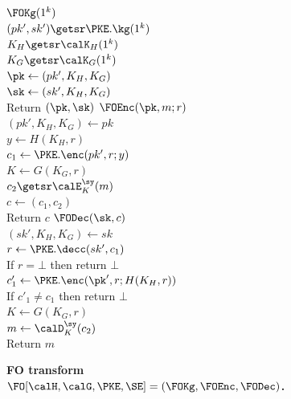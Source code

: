 \begin{figure}
    {\underline{$\FOKg(1^k)$}\\
    $(pk',sk') \getsr \PKE.\kg(1^k)$ \\
    $K_H \getsr \calK_H(1^k)$\\
    $K_G \getsr \calK_G(1^k)$\\
    $\pk \gets (pk',K_H,K_G)$ \\
    $\sk \gets (sk',K_H,K_G)$ \\
    Return $(\pk,\sk)$ 
}{
    \underline{$\FOEnc(\pk,m;r)$} \\
    $(pk', K_H, K_G) \gets pk$\\
    $y \gets H(K_H,r)$\\
    $c_1 \gets \PKE.\enc(pk',r;y)$\\
    $K \gets G(K_G,r)$\\
    $c_2 \getsr \calE^{\sy}_K(m)$\\
    $c \gets (c_1,c_2)$\\
    Return $c$
}{
    \underline{$\FODec(\sk,c)$} \\
    $(sk', K_H, K_G) \gets sk$\\
    $r \gets \PKE.\decc(sk',c_1)$ \\
    If $r=\bot$ then return $\bot$\\
    $c_1' \gets \PKE.\enc(\pk',r;H(K_H,r))$\\
    If $c'_1 \neq c_1$ then return $\bot$\\
    $K \gets G(K_G,r)$\\
    $m  \gets \calD^{\sy}_K(c_2)$ \\
    Return $m$ \vspace{0.5ex}
    }\vspace{-1ex}
\caption{\textbf{FO transform $\FO[\calH,\calG,\PKE,\SE] = (\FOKg, \FOEnc, \FODec)$.}}
\label{fig:fo-scheme}
\end{figure}

\fi 

\fi
\fi
